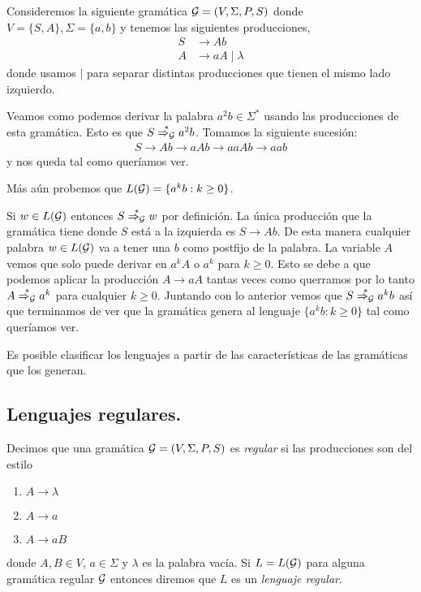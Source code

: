 \documentclass[tesis.tex]{subfiles}
\begin{document}
\medskip
\begin{ej}\label{gramatica-regular}
	Consideremos la siguiente gramática ${\cal G} = (V, \Sigma, P, S)$ donde $V = \{ S, A \}, \Sigma = \{ a,b \}$ y tenemos las siguientes producciones,
	\begin{align*}
		S & \to Ab \\
		A & \to aA \mid \lambda 
	\end{align*}
	donde usamos $\mid$ para separar distintas producciones que tienen el mismo lado izquierdo.
	
	Veamos como podemos derivar la palabra $a^2b \in \Sigma^*$ usando las producciones de esta gramática. 
	Esto es que $S \overset{*}{\Rightarrow_{\cal G}} a^2b$.
	Tomamos la siguiente sucesión:
	\begin{align*}
		S \to Ab \to aAb \to aaAb \to aab
	\end{align*} 
	y nos queda tal como queríamos ver.
	
	Más aún probemos que $L({\cal G}) = \{ a^{k}b : k \ge 0 \}$. 
	
	Si $w \in L(\cal G)$ entonces $S \overset{*}{\Rightarrow_{\cal G}} w$ por definición. 
	La única producción que la gramática tiene donde $S$ está a la izquierda es $S \to Ab$. 
	De esta manera cualquier palabra $w \in L(\cal G)$ va a tener una $b$ como postfijo de la palabra. 
	La variable $A$ vemos que solo puede derivar en $a^{k}A$ o $a^{k}$ para $k \ge 0$.
	Esto se debe a que podemos aplicar la producción $A \to aA$ tantas veces como querramos por lo tanto $A \overset{*}{\Rightarrow_{\cal G}} a^k$ para cualquier $k \ge 0$.
	Juntando con lo anterior vemos que $S \overset{*}{\Rightarrow_{\cal G}} a^{k}b$ así que terminamos de ver que la gramática genera al lenguaje $\{a^kb : k \ge 0\}$ tal como queríamos ver.
\end{ej}



Es posible clasificar los lenguajes a partir de las características de las gramáticas que los generan. 

\subsection{Lenguajes regulares.}

\begin{deff}
	Decimos que una gramática ${\cal G} = (V, \Sigma, P, S)$ es \emph{regular} si las producciones son del estilo
	\begin{enumerate}
		\item $A \to \lambda$
		\item $A \to a$
		\item $A \to a B$
	\end{enumerate}
	donde $A, B \in V$, $a \in \Sigma$ y $\lambda$ es la palabra vacía. 
	Si $L=L({\cal G})$ para alguna gramática regular $\cal G$ entonces diremos que $L$ es un \emph{lenguaje regular}. 
\end{deff}
\end{document}
